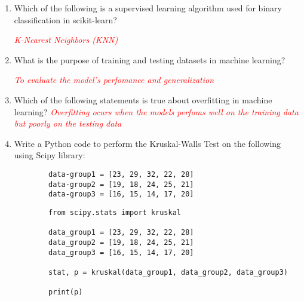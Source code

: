 \documentclass{article}
\begin{document}
\begin{enumerate}
    \item Which of the following is a supervised learning algorithm used for binary classification in scikit-learn? \par
    \textcolor{red}{\textit{K-Nearest Neighbors (KNN)}} 

    \item What is the purpose of training and testing datasets in machine learning? \par
    \textcolor{red}{\textit{To evaluate the model's perfomance and generalization}}

    \item Which of the following statements is true about overfitting in machine learning?
    \textcolor{red}{\textit{Overfitting ocurs when the models perfoms well on the training data but poorly on the testing data}}


    \item Write a Python code to perform the Kruskal-Walls Test on the following using Scipy library:
    \begin{verbatim}
        data-group1 = [23, 29, 32, 22, 28]
        data-group2 = [19, 18, 24, 25, 21]
        data-group3 = [16, 15, 14, 17, 20] 
    \end{verbatim}

    \begin{verbatim}
        from scipy.stats import kruskal

        data_group1 = [23, 29, 32, 22, 28]
        data_group2 = [19, 18, 24, 25, 21]
        data_group3 = [16, 15, 14, 17, 20]

        stat, p = kruskal(data_group1, data_group2, data_group3)

        print(p)
    \end{verbatim}

\end{enumerate}
\end{document}
